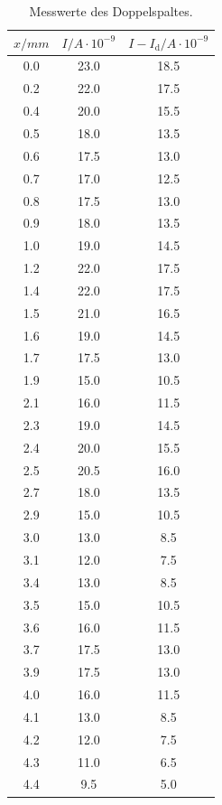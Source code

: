 \begin{table}
\label{tab:Tabelle1}
	\centering
\caption{Messwerte des Doppelspaltes.}
\begin{minipage}{0.46\textwidth}
    \centering
	\begin{tabular}{c|c|c}
		\toprule
		{$x / mm$} & {$I / A\cdot10^{-9}$}& {$I - I_\text{d} / A\cdot10^{-9}$} \\
		\hline
        \midrule
        0.0 &23.0&18.5\\
        0.2 &22.0&17.5 \\
        0.4 &20.0&15.5\\
        0.5 &18.0 &13.5\\
        0.6 &17.5&13.0\\
        0.7 &17.0&12.5\\
        0.8 &17.5&13.0\\
        0.9 &18.0&13.5\\
        1.0 &19.0&14.5\\
        1.2 &22.0&17.5\\
        1.4 &22.0&17.5\\
        1.5 &21.0&16.5\\
        1.6 &19.0&14.5\\
        1.7 &17.5&13.0\\
        1.9 &15.0&10.5\\
        2.1 &16.0&11.5\\
        2.3 &19.0&14.5\\
        2.4 &20.0&15.5\\
        2.5 &20.5&16.0\\
        2.7 &18.0&13.5\\
        2.9 &15.0&10.5\\
        3.0 &13.0&8.5\\
        3.1 &12.0&7.5\\
        3.4 &13.0&8.5\\
        3.5 &15.0&10.5\\
        3.6 &16.0&11.5\\
        3.7 &17.5&13.0\\
        3.9 &17.5&13.0\\
        4.0 &16.0&11.5\\
        4.1 &13.0&8.5\\
        4.2 &12.0&7.5\\
        4.3 &11.0&6.5\\
        4.4 &9.5&5.0\\
		\bottomrule 
	\end{tabular}

\end{minipage}
\end{table}
